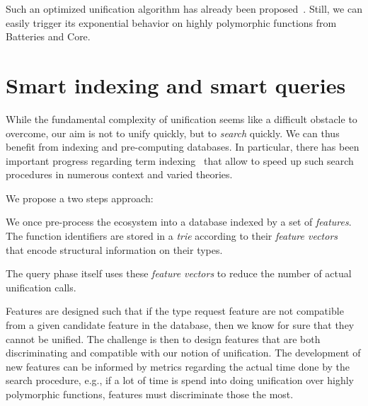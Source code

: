 \documentclass [a4paper,11pt]{scrartcl}
\begin{document}
Such an optimized unification algorithm has already been proposed~\cite{boudet}. Still, we can easily trigger its exponential behavior on highly polymorphic functions from Batteries and Core.




\section{Smart indexing and smart queries}

While the fundamental complexity of unification seems like a difficult
obstacle to overcome, our aim is not to unify quickly, but to \emph{search}
quickly. We can thus benefit from indexing and pre-computing databases.
In particular, there has been important progress regarding
term indexing~\cite{schulz,DBLP:books/el/RV01/RamakrishnanSV01} that allow
to speed up such search procedures in numerous context and varied theories.


We propose a two steps approach:
\begin{compactitem}
\item We once pre-process the ecosystem into a database indexed by a set of \emph{features}. The function identifiers are stored in a \textit{trie} according to their \textit{feature vectors}~\cite{schulz} that encode structural information on their types.
\item The query phase itself uses these \emph{feature vectors} to reduce the number of actual unification calls.
\end{compactitem}
Features are designed such that if the type request feature are not compatible
from a given candidate feature in the database, then we know for sure that they cannot be unified.  The challenge is then to design features that are both discriminating and compatible with  our notion of unification. 
The development of new features can be informed by metrics regarding the actual
time done by the search procedure, e.g., if a lot of time is spend
into doing unification over highly polymorphic functions, features
must discriminate those the most.
\end{document}
